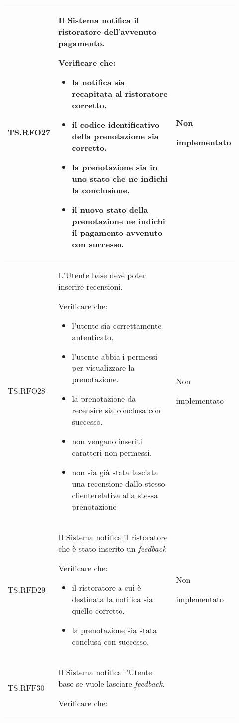\begin{longtable}{|p{0.10\linewidth}|p{0.70\linewidth}|p{0.12\linewidth}|}
    TS.RFO27 & 
    Il Sistema notifica il ristoratore dell’avvenuto pagamento.   \par 
    Verificare che: 
    \begin{itemize}
        \item la notifica sia recapitata al ristoratore corretto.
        \item il codice identificativo della prenotazione sia corretto.
        \item la prenotazione sia in uno stato che ne indichi la conclusione.
        \item il nuovo stato della prenotazione ne indichi il pagamento avvenuto con successo.
    \end{itemize}&
    Non \par implementato  \\
    \hline
    TS.RFO28 & 
    L’Utente base deve poter inserire recensioni.   \par 
    Verificare che: 
    \begin{itemize}
        \item l'utente sia correttamente autenticato.
        \item l'utente abbia i permessi per visualizzare la prenotazione.
        \item la prenotazione da recensire sia conclusa con successo.
        \item non vengano inseriti caratteri non permessi.
        \item non sia già stata lasciata una recensione dallo stesso cliente\g relativa alla stessa prenotazione
    \end{itemize}&
    Non \par implementato  \\
    \hline
    TS.RFD29 & 
    Il Sistema notifica il ristoratore che è stato inserito un \textit{feedback}\g   \par 
    Verificare che: 
    \begin{itemize}
        \item il ristoratore a cui è destinata la notifica sia quello corretto.
        \item la prenotazione sia stata conclusa con successo.
    \end{itemize}&
    Non \par implementato  \\
    \hline
    TS.RFF30 & 
    Il Sistema notifica l’Utente base se vuole lasciare \textit{feedback}.\par 
    Verificare che: 
    \begin{itemize}

\end{itemize}
\end{longtable}
